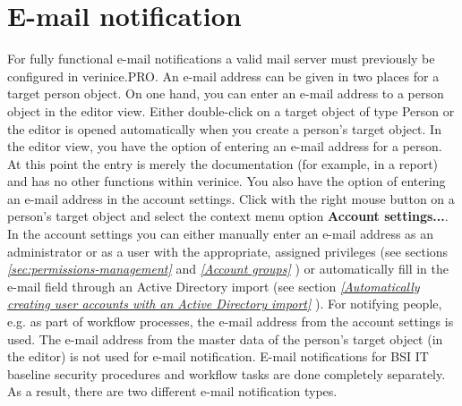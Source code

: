 \documentclass[a4paper,10pt]{book}
\begin{document}
\section{E-mail notification} \label{sec:E-mail-notification}
For fully functional e-mail notifications a valid mail server must previously be configured in verinice.PRO.
\newline
An e-mail address can be given in two places for a target person object. On one hand, you can enter an e-mail address to a person object in the editor view. Either double-click on a target object of type Person or the editor is opened automatically when you create a person's target object.
In the editor view, you have the option of entering an e-mail address for a person. At this point the entry is merely the documentation (for example, in a report) and has no other functions within verinice. You also have the option of entering an e-mail address in the account settings. Click with the right mouse button on a person's target object and select the context menu option \textbf{Account settings...}.
In the account settings you can either manually enter an e-mail address as an administrator or as a user with the appropriate, assigned privileges (see sections {\em \ref{sec:permissions-management} } and {\em \ref{Account groups} }) or automatically fill in the e-mail field through an Active Directory import (see section {\em \ref{Automatically creating user accounts with an Active Directory import} }).
\newline
For notifying people, e.g. as part of workflow processes, the e-mail address from the account settings is used.
The e-mail address from the master data of the person's target object (in the editor) is not used for e-mail notification.
\newline
E-mail notifications for BSI IT baseline security procedures and workflow tasks are done completely separately.
As a result, there are two different e-mail notification types.
\newline
\end{document}
